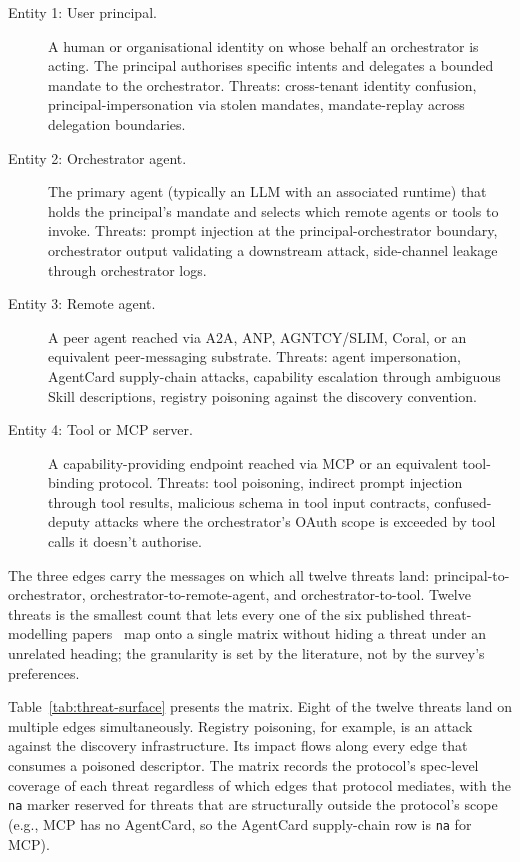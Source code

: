\begin{description}
  \item[Entity 1: User principal.] A human or
    organisational identity on whose behalf an orchestrator
    is acting. The principal authorises specific intents and
    delegates a bounded mandate to the orchestrator. Threats:
    cross-tenant identity confusion, principal-impersonation
    via stolen mandates, mandate-replay across delegation
    boundaries.
  \item[Entity 2: Orchestrator agent.] The primary
    agent (typically an LLM with an associated runtime)
    that holds the principal's mandate and selects which
    remote agents or tools to invoke. Threats:
    prompt injection at the principal-orchestrator
    boundary, orchestrator output validating
    a downstream attack, side-channel leakage through
    orchestrator logs.
  \item[Entity 3: Remote agent.] A peer agent reached
    via A2A, ANP, AGNTCY/SLIM, Coral, or an equivalent
    peer-messaging substrate. Threats: agent impersonation,
    AgentCard supply-chain attacks, capability escalation
    through ambiguous Skill descriptions, registry poisoning
    against the discovery convention.
  \item[Entity 4: Tool or MCP server.] A
    capability-providing endpoint reached via MCP or an
    equivalent tool-binding protocol. Threats: tool
    poisoning, indirect prompt injection through tool
    results, malicious schema in tool input contracts,
    confused-deputy attacks where the orchestrator's
    OAuth scope is exceeded by tool calls it doesn't
    authorise.
\end{description}

The three edges carry the messages on which all
twelve threats land: principal-to-orchestrator,
orchestrator-to-remote-agent, and
orchestrator-to-tool. Twelve threats is the smallest count
that lets every one of the six published threat-modelling
papers~\cite{kong2025communication, a2asecbench,
threatmodel2026, protocol_exploits, a2a_weaknesses,
zhan2024injecagent} map onto a single matrix without
hiding a threat under an unrelated heading; the granularity
is set by the literature, not by the survey's preferences.

\clearpage

Table~\ref{tab:threat-surface} presents the matrix.
Eight of the twelve threats land on multiple edges
simultaneously. Registry poisoning, for example, is an
attack against the discovery infrastructure. Its impact
flows along every edge that consumes a poisoned descriptor.
The matrix records the protocol's spec-level coverage of
each threat regardless of which edges that protocol mediates,
with the \texttt{na} marker reserved for threats that are
structurally outside the protocol's scope (e.g., MCP has no
AgentCard, so the AgentCard supply-chain row is
\texttt{na} for MCP).

